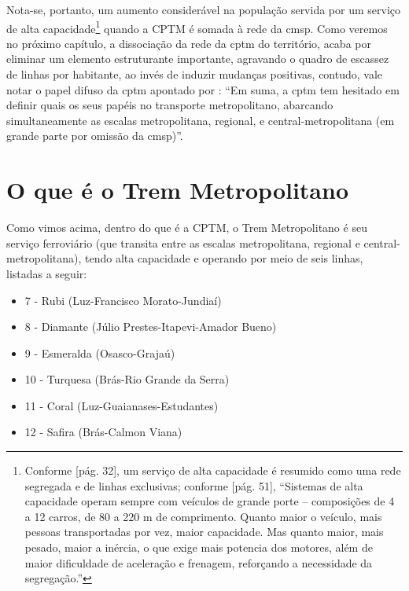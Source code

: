 	Nota-se, portanto, um aumento considerável na população servida por um serviço de alta capacidade\footnote{Conforme [pág. 32], um serviço de alta capacidade é resumido como uma rede segregada e de linhas exclusivas; conforme [pág. 51], ``Sistemas  de  alta  capacidade  operam  sempre  com  veículos  de  grande porte – composições de 4 a 12 carros, de 80 a 220 m de comprimento. Quanto  maior  o  veículo,  mais  pessoas  transportadas  por  vez,  maior capacidade.  Mas  quanto  maior,  mais  pesado,  maior  a  inércia,  o  que exige  mais  potencia  dos  motores,  além  de  maior  dificuldade  de aceleração e frenagem, reforçando a necessidade da segregação.''} quando a CPTM é somada à rede da \gls{cmsp}. Como veremos no próximo capítulo, a dissociação da rede da \gls{cptm} do território, acaba por eliminar um elemento estruturante importante, agravando o quadro de escassez de linhas por habitante, ao invés de induzir mudanças positivas, contudo, vale notar o papel difuso da \gls{cptm} apontado por : ``Em suma, a \gls{cptm} tem hesitado em definir quais os seus papéis no transporte metropolitano, abarcando simultaneamente as escalas metropolitana, regional, e central-metropolitana (em grande parte por omissão da \gls{cmsp})''. 
		
	\section{O que é o Trem Metropolitano}
	
	Como vimos acima, dentro do que é a CPTM, o Trem Metropolitano é seu serviço ferroviário (que transita entre as escalas metropolitana, regional e central-metropolitana), tendo alta capacidade e operando por meio de seis linhas, listadas a seguir:
		\begin{itemize}
			\item 7 - Rubi (Luz-Francisco Morato-Jundiaí)
			\item 8 - Diamante (Júlio Prestes-Itapevi-Amador Bueno)
			\item 9 - Esmeralda (Osasco-Grajaú)
			\item 10 - Turquesa (Brás-Rio Grande da Serra)
			\item 11 - Coral (Luz-Guaianases-Estudantes)
			\item 12 - Safira (Brás-Calmon Viana)
		\end{itemize}
	

